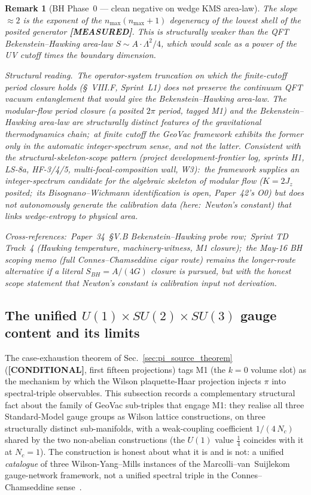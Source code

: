 \documentclass[11pt]{article}
\newtheorem{remark}{Remark}
\begin{document}
\begin{remark}[BH Phase~0 — clean negative on wedge KMS area-law]
The slope $\approx 2$ is the exponent of the $n_{\max}(n_{\max}+1)$
degeneracy of the lowest shell of the posited generator
\textbf{[MEASURED]}.  This
is structurally weaker than the QFT Bekenstein--Hawking area-law
$S \sim A \cdot \Lambda^2 / 4$, which would scale as a power of the
UV cutoff times the boundary dimension.

\emph{Structural reading.}\ The operator-system truncation on which
the finite-cutoff period closure holds
(\S~VIII.F, Sprint~L1) does \emph{not} preserve the continuum QFT
vacuum entanglement that would give the Bekenstein--Hawking area-law.
The modular-flow period closure (a posited $2\pi$ period, tagged M1) and
the Bekenstein--Hawking area-law are structurally distinct features
of the gravitational thermodynamics chain;\ at finite cutoff the
GeoVac framework exhibits the former only in the automatic
integer-spectrum sense, and not the latter.  Consistent
with the structural-skeleton-scope pattern (project development-frontier log, sprints
H1, LS-8a, HF-3/4/5, multi-focal-composition wall, W3):\ the
framework supplies an integer-spectrum candidate for the algebraic
skeleton of modular flow ($K = 2J_z$ posited;\ its Bisognano--Wichmann
identification is open, Paper~42's O0) but does not autonomously
generate the calibration data (here:\ Newton's
constant) that links wedge-entropy to physical area.

Cross-references:\ Paper~34~\S V.B Bekenstein--Hawking probe row;\
Sprint TD Track~4 (Hawking temperature, machinery-witness, M1
closure);\ the May-16 BH scoping memo
(full Connes--Chamseddine cigar route) remains the longer-route
alternative if a literal $S_{BH} = A/(4G)$ closure is pursued, but
with the honest scope statement that Newton's constant is calibration
input not derivation.
\end{remark}

\subsection{The unified $U(1) \times SU(2) \times SU(3)$ gauge
content and its limits}
\label{sec:unified_gauge}

The case-exhaustion theorem of Sec.~\ref{sec:pi_source_theorem}
(\textbf{[CONDITIONAL]}, first fifteen projections) tags M1 (the $k = 0$
volume slot) as the mechanism by which the
Wilson plaquette-Haar projection injects $\pi$ into spectral-triple
observables.  This subsection records a complementary structural
fact about the family of GeoVac sub-triples that engage M1: they
realise all three Standard-Model gauge groups as Wilson lattice
constructions, on three structurally distinct sub-manifolds, with a
weak-coupling coefficient $1/(4\,N_c)$ shared by the two non-abelian
constructions (the $U(1)$ value $\tfrac14$ coincides with it at
$N_c = 1$).  The
construction is honest about what it is and is not: a unified
\emph{catalogue} of three Wilson-Yang--Mills instances of the
Marcolli--van~Suijlekom gauge-network framework, not a unified
spectral triple in the Connes--Chamseddine
sense~\cite{chamseddine_connes1997_2008}.
\end{document}
